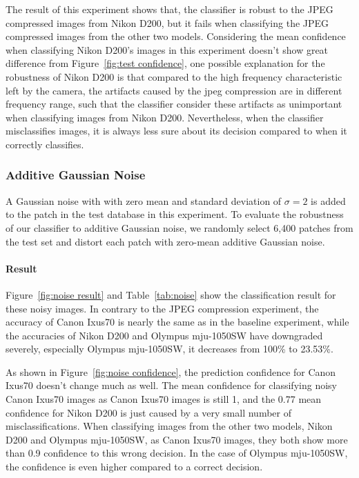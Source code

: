 \documentclass[a4paper, 9pt, twocolumn]{extarticle}
\begin{document}
The result of this experiment shows that, the classifier is robust to the JPEG compressed images from Nikon D200, but it fails when classifying the JPEG compressed images from the other two models. Considering the mean confidence when classifying Nikon D200's images in this experiment doesn't show great difference from Figure~\ref{fig:test confidence}, one possible explanation for the robustness of Nikon D200 is that compared to the high frequency characteristic left by the camera,  the artifacts caused by the jpeg compression are in different frequency range, such that the classifier consider these artifacts as unimportant when classifying images from Nikon D200. Nevertheless, when the classifier misclassifies images, it is always less sure about its decision compared to when it correctly classifies.

\subsubsection{Additive Gaussian Noise}
\label{section:noise}

A Gaussian noise with with zero mean and standard deviation of $ \sigma = 2 $ is added to the patch in the test database in this experiment. To evaluate the robustness of our classifier to additive Gaussian noise, we randomly select 6,400 patches from the test set and distort each patch with zero-mean additive Gaussian noise.

\paragraph{Result}
\label{section:noise result}

Figure~\ref{fig:noise result} and Table~\ref{tab:noise} show the classification result for these noisy images. In contrary to the JPEG compression experiment, the accuracy of Canon Ixus70 is nearly the same as in the baseline experiment, while the accuracies of Nikon D200 and Olympus mju-1050SW have downgraded severely, especially Olympus mju-1050SW, it decreases from 100\% to 23.53\%.

As shown in Figure~\ref{fig:noise confidence}, the prediction confidence for Canon Ixus70 doesn't change much as well. The mean confidence for classifying noisy Canon Ixus70 images as Canon Ixus70 images is still 1, and the 0.77 mean confidence for Nikon D200 is just caused by a very small number of misclassifications. When classifying images from the other two models, Nikon D200 and Olympus mju-1050SW, as Canon Ixus70 images, they both show more than 0.9 confidence to this wrong decision. In the case of Olympus mju-1050SW, the confidence is even higher compared to a correct decision. 
\end{document}
